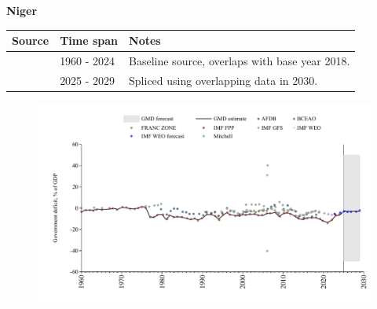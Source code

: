 \documentclass[12pt,a4paper,landscape]{article}
\begin{document}
\begin{adjustbox}{max totalsize={\paperwidth}{\paperheight},center}
\begin{minipage}[t][\textheight][t]{\textwidth}
\vspace*{0.5cm}
{}
\begin{center}
{\Large\bfseries Niger}
\end{center}
\vspace{0.5cm}
\begin{table}[H]
\centering
\small
\begin{tabular}{|l|l|l|}
\hline
\textbf{Source} & \textbf{Time span} & \textbf{Notes} \\
\hline
\rowcolor{white}\cite{BCEAO}& 1960 - 2024 &Baseline source, overlaps with base year 2018.\\
\rowcolor{lightgray}\cite{IMF_WEO_forecast}& 2025 - 2029 &Spliced using overlapping data in 2030.\\
\hline
\end{tabular}
\end{table}
\begin{figure}[H]
\centering
\includegraphics[width=\textwidth,height=0.6\textheight,keepaspectratio]{graphs/NER_govdef_GDP.pdf}
\end{figure}
\end{minipage}
\end{adjustbox}
\end{document}
